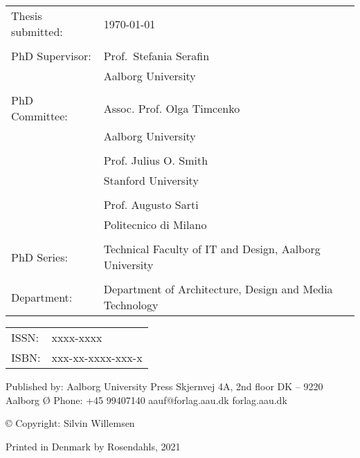 \thispagestyle{empty}
\noindent
\fontsize{9.5}{12}\selectfont %
\begin{tabularx}{\textwidth}{@{}lX}
    Thesis submitted: & \today\\
    \\
    PhD Supervisor: & Prof.\ Stefania Serafin\\
                    & Aalborg University\\
                    \\
    PhD Committee:  & Assoc. Prof. Olga Timcenko\\
                    & Aalborg University\\
                    \\
                    & Prof. Julius O. Smith \\
                    & Stanford University\\
                    \\
                    & Prof. Augusto Sarti\\
                    & Politecnico di Milano\\
                   \\
    PhD Series:    & Technical Faculty of IT and Design, Aalborg University\\
    \\
    Department: & Department of Architecture, Design and Media Technology
\end{tabularx}
\normalsize
\strut\vfill
\noindent
\begin{tabularx}{\textwidth}{@{}lX}
    ISSN: & xxxx-xxxx\\
    ISBN: & xxx-xx-xxxx-xxx-x\\
\end{tabularx}
\strut\vfill
\noindent Published by:\newline
Aalborg University Press\newline
Skjernvej 4A, 2nd floor\newline
DK – 9220 Aalborg Ø\newline
Phone: +45 99407140\newline
aauf@forlag.aau.dk\newline
forlag.aau.dk
\strut\vfill
\noindent \copyright{} Copyright: Silvin Willemsen\newline
\strut\vfill
\noindent Printed in Denmark by Rosendahls, 2021
\clearpage

